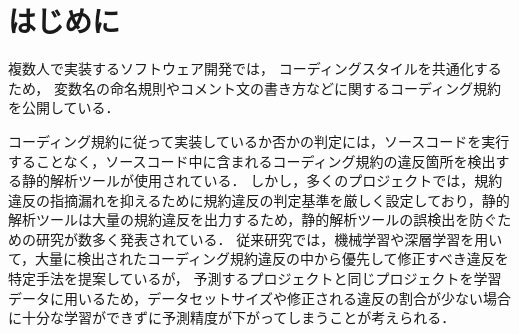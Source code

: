\documentclass[T,J]{fose} %
\newcommand{\todo}[1]{\colorbox{yellow}{{\bf TODO}:}{\color{red} {\textbf{[#1]}}}}
\begin{document}
\section{はじめに}

複数人で実装するソフトウェア開発では，
コーディングスタイルを共通化するため，
変数名の命名規則やコメント文の書き方などに関するコーディング規約を公開している．

コーディング規約に従って実装しているか否かの判定には，ソースコードを実行することなく，ソースコード中に含まれるコーディング規約の違反箇所を検出する静的解析ツールが使用されている．
しかし，多くのプロジェクトでは，規約違反の指摘漏れを抑えるために規約違反の判定基準を厳しく設定しており，静的解析ツールは大量の規約違反を出力するため，静的解析ツールの誤検出を防ぐための研究が数多く発表されている\cite{Nguyen}．
従来研究では，機械学習や深層学習を用いて，大量に検出されたコーディング規約違反の中から優先して修正すべき違反を特定手法を提案しているが，
予測するプロジェクトと同じプロジェクトを学習データに用いるため，データセットサイズや修正される違反の割合が少ない場合に十分な学習ができずに予測精度が下がってしまうことが考えられる．
\end{document}
